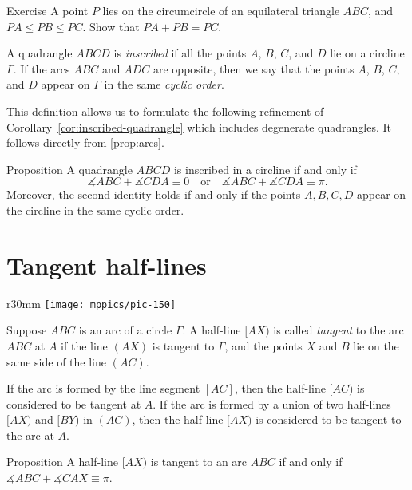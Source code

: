 \begin{thm}{Exercise}\label{ex:a+b=c}
A point $P$ lies on the circumcircle of an equilateral triangle $ABC$,
and $PA\le PB\le PC$.
Show that $PA+PB=PC$.
\end{thm}

A quadrangle $ABCD$ is 
\emph{inscribed}
if all the points $A$, $B$, $C$, and $D$ lie on a circline $\Gamma$.
If the arcs $ABC$ and $ADC$ are opposite, then we say that the points $A$, $B$, $C$, and $D$ appear on $\Gamma$ in the same \emph{cyclic order}.

This definition allows us to formulate the following refinement of Corollary~\ref{cor:inscribed-quadrangle} which includes degenerate quadrangles.
It follows directly from \ref{prop:arcs}.

\begin{thm}{Proposition}\label{prop:inscribed-quadrangle}
A quadrangle $ABCD$ is inscribed in a circline if and only if 
\[\measuredangle ABC+\measuredangle CDA\equiv 0
\quad\text{or}\quad
\measuredangle ABC+\measuredangle CDA\equiv\pi.\]
Moreover, the second identity holds if and only if the points $A,B,C,D$ appear on the circline in the same cyclic order.
\end{thm}

\section{Tangent half-lines}

{

\begin{wrapfigure}[6]{r}{30mm}
\vskip-14mm
\centering
\texttt{[image: mppics/pic-150]}
\end{wrapfigure}

Suppose $ABC$ is an arc of a circle $\Gamma$.
A half-line $[AX)$ is called 
\emph{tangent} 
to the arc $ABC$ at $A$
if the line $(AX)$ is tangent to $\Gamma$, and the points $X$ and $B$ lie on the same side of the line $(AC)$.

}

If the arc is formed by the line segment $[AC]$, then the half-line $[AC)$ is considered to be tangent at $A$.
If the arc is formed by a union of two half-lines $[AX)$ and $[BY)$ in $(AC)$,
then the half-line $[AX)$ is considered to be tangent to the arc at $A$.

\begin{thm}{Proposition}\label{prop:arc(angle=tan)}
A half-line $[AX)$ is tangent to an arc $ABC$ if and only if 
$\measuredangle ABC+\measuredangle CAX\equiv \pi$.
\end{thm}

